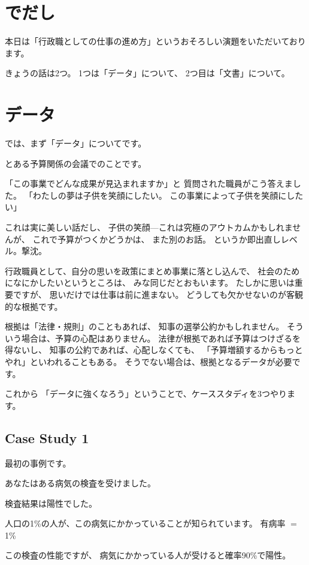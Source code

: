 \documentclass[uplatex,jis2004,dvipdfmx,14pt]{jsarticle}
\begin{document}
\section{でだし}
本日は「行政職としての仕事の進め方」というおそろしい演題をいただいております。

きょうの話は2つ。
1つは「データ」について、
2つ目は「文書」について。


\section{データ}
では、まず「データ」についてです。

とある予算関係の会議でのことです。

「この事業でどんな成果が見込まれますか」と
質問された職員がこう答えました。
「わたしの夢は子供を笑顔にしたい。
この事業によって子供を笑顔にしたい」

これは実に美しい話だし、
子供の笑顔---これは究極のアウトカムかもしれませんが、
これで予算がつくかどうかは、
また別のお話。
というか即出直しレベル。撃沈。

行政職員として、自分の思いを政策にまとめ事業に落とし込んで、
社会のためになにかしたいというところは、
みな同じだとおもいます。
たしかに思いは重要ですが、
思いだけでは仕事は前に進まない。
どうしても欠かせないのが客観的な根拠です。

根拠は「法律・規則」のこともあれば、
知事の選挙公約かもしれません。
そういう場合は、予算の心配はありません。
法律が根拠であれば予算はつけざるを得ないし、
知事の公約であれば、心配しなくても、
「予算増額するからもっとやれ」といわれることもある。
そうでない場合は、根拠となるデータが必要です。

これから
「データに強くなろう」ということで、ケーススタディを3つやります。

\newpage
\subsection{Case Study 1}
最初の事例です。

あなたはある病気の検査を受けました。

検査結果は陽性でした。

人口の1\%の人が、この病気にかかっていることが知られています。
有病率 $=$ 1\%

この検査の性能ですが、
病気にかかっている人が受けると確率90\%で陽性。
\end{document}
